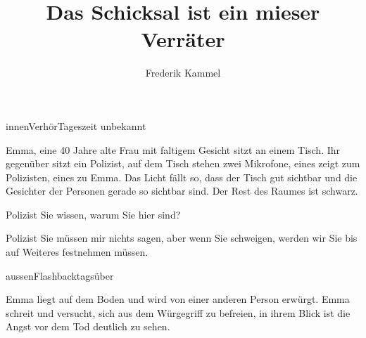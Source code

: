 \documentclass[12pt]{article}
\title{Das Schicksal ist ein mieser Verräter}
\author{Frederik Kammel}
\begin{document}
    


    \begin{scene}[fade in]{innen}{Verhör}{Tageszeit unbekannt}
        \begin{scenedescription}
            \gls{Emma}, eine 40 Jahre alte Frau mit faltigem Gesicht sitzt an einem Tisch.
            Ihr gegenüber sitzt ein \gls{Polizist}, auf dem Tisch stehen zwei Mikrofone, eines zeigt zum \gls{Polizist}en, eines zu Emma.
            Das Licht fällt so, dass der Tisch gut sichtbar und die Gesichter der Personen gerade so sichtbar sind.
            Der Rest des Raumes ist schwarz.
        \end{scenedescription}

        \begin{dialog}{Polizist}
            Sie wissen, warum Sie hier sind?
        \end{dialog}


        \begin{dialog}[Fortsetzung]{Polizist}
            Sie müssen mir nichts sagen, aber wenn Sie schweigen, werden wir Sie bis auf Weiteres festnehmen müssen.
        \end{dialog}
    \end{scene}

    \begin{scene}{aussen}{Flashback}{tagsüber}
        \begin{scenedescription}
            \gls{Emma} liegt auf dem Boden und wird von einer anderen Person erwürgt.
            \gls{Emma} schreit und versucht, sich aus dem Würgegriff zu befreien, in ihrem Blick ist die Angst vor dem Tod deutlich zu sehen.
        \end{scenedescription}
    \end{scene}
\end{document}
